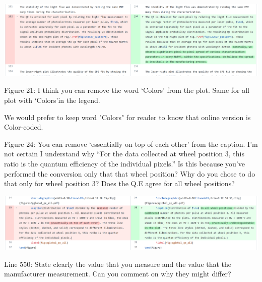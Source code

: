 \documentclass[11pt]{report}
\begin{document}
\includegraphics[width=\linewidth]{round1/1.09.png}

\begin{tcolorbox}[enlarge top by=2em,colbacktitle=blue!60!white,colframe=black!80!white,left=0pt,right=0pt,top=0pt,bottom=0pt,boxrule=0.3pt,title=\bfseries1.10]
Figure 21:  I think you can remove the word ‘Colors’ from the plot.  Same for all plot with ‘Colors’in the legend.
\end{tcolorbox}

We would prefer to keep word "Colors" for reader to know that online version is Color-coded.


\begin{tcolorbox}[enlarge top by=2em,colbacktitle=black!60!white,colframe=black!80!white,left=0pt,right=0pt,top=0pt,bottom=0pt,boxrule=0.3pt,title=\bfseries1.11]
Figure 24:  You can remove ‘essentially on top of each other’ from the caption.  I’m not certain I understand why “For the data collected at wheel position 3,  this ratio is the quantum efficiency of the individual pixels.” Is this because you’ve performed the conversion only that that wheel position? Why do you chose to do that only for wheel position 3?  Does the Q.E agree for all wheel positions?
\end{tcolorbox}


\includegraphics[width=\linewidth]{round1/1.11.png}

\begin{tcolorbox}[enlarge top by=2em,colbacktitle=black!60!white,colframe=black!80!white,left=0pt,right=0pt,top=0pt,bottom=0pt,boxrule=0.3pt,title=\bfseries1.12]
Line 550:  State clearly the value that you measure and the value that the manufacturer measurement.  Can you comment on why they might differ?
\end{tcolorbox}
\end{document}
